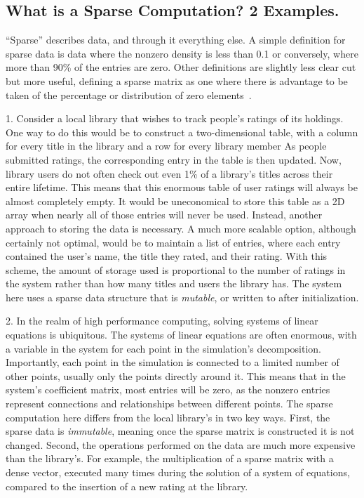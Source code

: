 \subsection{What is a Sparse Computation? 2 Examples.}

``Sparse'' describes data, and through it everything else. 
A simple definition for sparse data is data where the nonzero density is less than 0.1 or conversely, where more than 90\% of the entries are zero.
Other definitions are slightly less clear cut but more useful, defining a sparse matrix as one where there is advantage to be taken of the percentage or distribution of zero elements~\cite{duff1977survey}.

1.
Consider a local library that wishes to track people's ratings of its holdings.
One way to do this would be to construct a two-dimensional table, with a column for every title in the library and a row for every library member
As people submitted ratings, the corresponding entry in the table is then updated.
Now, library users do not often check out even 1\% of a library's titles across their entire lifetime.
This means that this enormous table of user ratings will always be almost completely empty.
It would be uneconomical to store this table as a 2D array when nearly all of those entries will never be used.
Instead, another approach to storing the data is necessary.
A much more scalable option, although certainly not optimal, would be to maintain a list of entries, where each entry contained the user's name, the title they rated, and their rating.
With this scheme, the amount of storage used is proportional to the number of ratings in the system rather than how many titles and users the library has.
The system here uses a sparse data structure that is \textit{mutable}, or written to after initialization.

2. 
In the realm of high performance computing, solving systems of linear equations is ubiquitous.
The systems of linear equations are often enormous, with a variable in the system for each point in the simulation's decomposition.
Importantly, each point in the simulation is connected to a limited number of other points, usually only the points directly around it.
This means that in the system's coefficient matrix, most entries will be zero, as the nonzero entries represent connections and relationships between different points.
The sparse computation here differs from the local library's in two key ways.
First, the sparse data is \textit{immutable}, meaning once the sparse matrix is constructed it is not changed.
Second, the operations performed on the data are much more expensive than the library's.
For example, the multiplication of a sparse matrix with a dense vector, executed many times during the solution of a system of equations, compared to the insertion of a new rating at the library.

